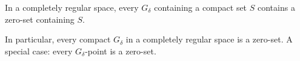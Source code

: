 In a completely regular space, every $G_{\delta}$ containing a compact set $S$ contains a zero-set containing $S$.

In particular, every compact $G_{\delta}$ in a completely regular space is a zero-set. A special case: every $G_{\delta}$-point is a zero-set.
